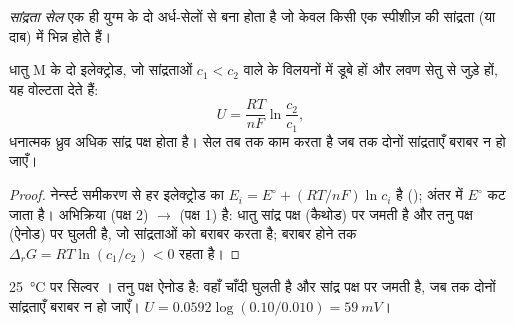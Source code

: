 \begin{definition}[सांद्रता सेल]\label{def:b2:cell-thermodynamics:concentration-cell}
\emph{सांद्रता सेल} एक ही युग्म के दो
अर्ध-सेलों से बना होता है जो केवल किसी एक स्पीशीज़ की सांद्रता (या
दाब) में भिन्न होते हैं।
\end{definition}

\begin{proposition}[सांद्रता सेल की वोल्टता]\label{prop:b2:cell-thermodynamics:concentration-cell}
धातु M के दो इलेक्ट्रोड, जो सांद्रताओं $c_1 < c_2$ वाले  के
विलयनों में डूबे हों और लवण सेतु से जुड़े हों, यह वोल्टता देते हैं:
\[
  U = \frac{RT}{nF}\ln\frac{c_2}{c_1} ,
\]
धनात्मक ध्रुव अधिक सांद्र पक्ष होता है। सेल तब तक काम करता है जब तक
दोनों सांद्रताएँ बराबर न हो जाएँ।
\end{proposition}

\begin{proof}
नेर्न्स्ट समीकरण से हर इलेक्ट्रोड का $E_i = E^\circ + (RT/nF)\ln c_i$ है (); अंतर में $E^\circ$ कट जाता है। अभिक्रिया
(पक्ष 2) $\to$ (पक्ष 1) है: धातु
सांद्र पक्ष (कैथोड) पर जमती है और तनु पक्ष (ऐनोड) पर घुलती है, जो
सांद्रताओं को बराबर करता है; बराबर होने तक $\Delta_r G = RT\ln(c_1/c_2) < 0$
रहता है।
\end{proof}

\begin{omfigure}

{\small \qty{25}{\degreeCelsius} पर सिल्वर । तनु पक्ष
ऐनोड है: वहाँ चाँदी घुलती है और सांद्र पक्ष पर जमती है,
जब तक दोनों सांद्रताएँ बराबर न हो जाएँ। $U = 0.0592\log(0.10/0.010) =
\qty{59}{mV}$।}
\end{omfigure}

